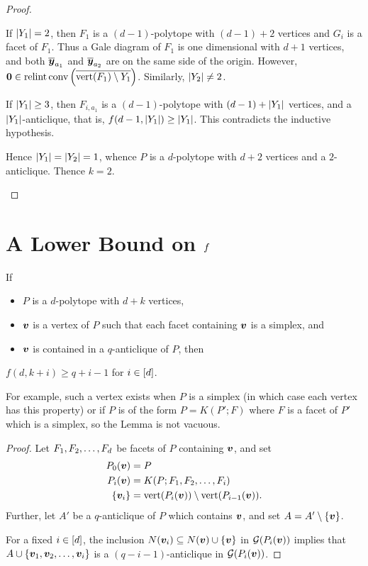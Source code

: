 \begin{proof}
\begin{enumerate}
                If \(\left\lvert Y_1\right\rvert=2\), then \(F_1\) is a \((d-1)\)-polytope with \((d-1)+2\) vertices and \(G_i\) is a facet of \(F_1\).  Thus a Gale diagram of \(F_1\) is one dimensional with \(d+1\) vertices, and both \(\overline{\bm{y}}_{a_1}\) and \(\overline{\bm{y}}_{a_2}\) are on the same side of the origin.  However, \(\bm{0}\in\operatorname{relint}\operatorname{conv}{\left(\overline{\operatorname{vert}(F_1)\setminus Y_1}\right)}\).  Similarly, \(\left\lvert Y_2\right\rvert\ne2\).

                If \(\left\lvert Y_1\right\rvert\ge 3\), then \(F_{i,a_1}\) is a \((d-1)\)-polytope with \((d-1)+\left\lvert Y_1\right\rvert\) vertices, and a \(\left\lvert Y_1\right\rvert\)-anticlique, that is, \(f(d-1,\left\lvert Y_1\right\rvert)\ge\left\lvert Y_1\right\rvert\).  This contradicts the inductive hypothesis.

                Hence \(\left\lvert Y_1\right\rvert=\left\lvert Y_2\right\rvert=1\), whence \(P\) is a \(d\)-polytope with \(d+2\) vertices and a \(2\)-anticlique.  Thence \(k=2\).
        \end{enumerate}
\end{proof}

\section{A Lower Bound on \protect$f\protect$}

\begin{Lemma}
    If
        \begin{itemize}
            \item   \(P\) is a \(d\)-polytope with \(d+k\) vertices,
            \item   \(\bm{v}\) is a vertex of \(P\) such that each facet containing \(\bm{v}\) is a simplex, and
            \item   \(\bm{v}\) is contained in a \(q\)-anticlique of \(P\), then
        \end{itemize}
    \(f(d,k+i)\ge q+i-1\) for \(i\in\left[d\right]\).
\end{Lemma}
    For example, such a vertex exists when \(P\) is a simplex (in which case each vertex has this property) or if \(P\) is of the form \(P=K(P';F)\) where \(F\) is a facet of \(P'\) which is a simplex, so the Lemma is not vacuous.
\begin{proof}
    Let \(F_1,F_2,\dotsc, F_d\) be facets of \(P\) containing \(\bm{v}\), and set
        \begin{align*}
            P_0(\bm{v})
                    &=P\\
            P_i(\bm{v})
                    &=K(P;F_1,F_2,\dotsc, F_i)\\
            \left\{\bm{v}_i\right\}
                    &=\operatorname{vert}(P_i(\bm{v}))\setminus\operatorname{vert}(P_{i-1}(\bm{v})).
        \end{align*}
    Further, let \(A'\) be a \(q\)-anticlique of \(P\) which contains \(\bm{v}\), and set \(A=A'\setminus\left\{\bm{v}\right\}\).

    For a fixed \(i\in\left[d\right]\), the inclusion \(N(\bm{v}_i)\subseteq N(\bm{v})\cup\left\{\bm{v}\right\}\) in \(\mathcal{G}(P_i(\bm{v}))\) implies that  \(A\cup\left\{\bm{v}_1,\bm{v}_2,\dotsc,\bm{v}_i\right\}\) is a \((q-i-1)\)-anticlique in \(\mathcal{G}(P_i(\bm{v}))\).
\end{proof}

